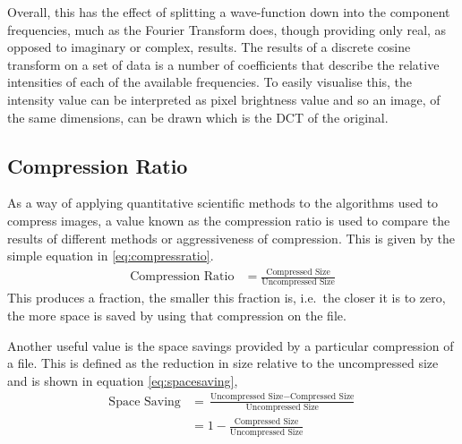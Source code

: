 Overall, this has the effect of splitting a wave-function down into the component frequencies, much as the Fourier Transform does, though providing only real, as opposed to imaginary or complex, results. The results of a discrete cosine transform on a set of data is a number of coefficients that describe the relative intensities of each of the available frequencies. To easily visualise this, the intensity value can be interpreted as pixel brightness value and so an image, of the same dimensions, can be drawn which is the DCT of the original.

\subsection{Compression Ratio} %
\label{sub:compression_ratio}
As a way of applying quantitative scientific methods to the algorithms used to compress images, a value known as the compression ratio is used to compare the results of different methods or aggressiveness of compression. This is given by the simple equation in \ref{eq:compressratio}.
\begin{align}
	\text{Compression Ratio} &= \frac{\text{Compressed Size}}{\text{Uncompressed Size}} \label{eq:compressratio}
\end{align}
This produces a fraction, the smaller this fraction is, i.e.\ the closer it is to zero, the more space is saved by using that compression on the file.

Another useful value is the space savings provided by a particular compression of a file. This is defined as the reduction in size relative to the uncompressed size and is shown in equation \ref{eq:spacesaving},
\begin{align}
	\text{Space Saving} &= \frac{\text{Uncompressed Size} - \text{Compressed Size}}{\text{Uncompressed Size}} \\
	 &= 1- \frac{\text{Compressed Size}}{\text{Uncompressed Size}} \label{eq:spacesaving}
\end{align}

